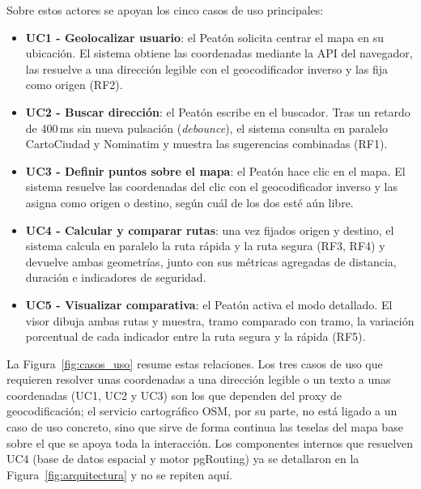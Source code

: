 Sobre estos actores se apoyan los cinco casos de uso principales:

\begin{itemize}
    \item \textbf{UC1 - Geolocalizar usuario}: el Peatón solicita centrar el mapa en su ubicación. El sistema obtiene las coordenadas mediante la API del navegador, las resuelve a una dirección legible con el geocodificador inverso y las fija como origen (RF2).
    \item \textbf{UC2 - Buscar dirección}: el Peatón escribe en el buscador. Tras un retardo de 400\,ms sin nueva pulsación (\textit{debounce}), el sistema consulta en paralelo CartoCiudad y Nominatim y muestra las sugerencias combinadas (RF1).
    \item \textbf{UC3 - Definir puntos sobre el mapa}: el Peatón hace clic en el mapa. El sistema resuelve las coordenadas del clic con el geocodificador inverso y las asigna como origen o destino, según cuál de los dos esté aún libre.
    \item \textbf{UC4 - Calcular y comparar rutas}: una vez fijados origen y destino, el sistema calcula en paralelo la ruta rápida y la ruta segura (RF3, RF4) y devuelve ambas geometrías, junto con sus métricas agregadas de distancia, duración e indicadores de seguridad.
    \item \textbf{UC5 - Visualizar comparativa}: el Peatón activa el modo detallado. El visor dibuja ambas rutas y muestra, tramo comparado con tramo, la variación porcentual de cada indicador entre la ruta segura y la rápida (RF5).
\end{itemize}

La Figura~\ref{fig:casos_uso} resume estas relaciones. Los tres casos de uso que requieren resolver unas coordenadas a una dirección legible o un texto a unas coordenadas (UC1, UC2 y UC3) son los que dependen del proxy de geocodificación; el servicio cartográfico OSM, por su parte, no está ligado a un caso de uso concreto, sino que sirve de forma continua las teselas del mapa base sobre el que se apoya toda la interacción. Los componentes internos que resuelven UC4 (base de datos espacial y motor pgRouting) ya se detallaron en la Figura~\ref{fig:arquitectura} y no se repiten aquí.


